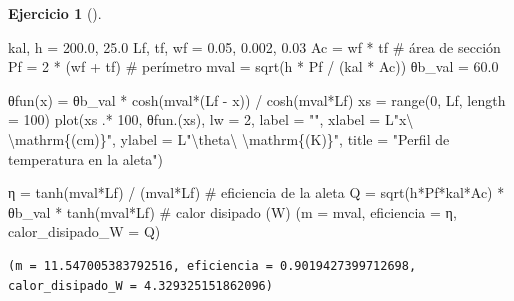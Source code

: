 \documentclass[
  spanish,
  a4paper,
]{scrreport}
\newenvironment{Shaded}{\begin{snugshade}}{\end{snugshade}}
\newcommand{\CommentTok}[1]{\textcolor[rgb]{0.37,0.37,0.37}{#1}}
\newcommand{\FloatTok}[1]{\textcolor[rgb]{0.68,0.00,0.00}{#1}}
\newcommand{\FunctionTok}[1]{\textcolor[rgb]{0.28,0.35,0.67}{#1}}
\newcommand{\NormalTok}[1]{\textcolor[rgb]{0.00,0.23,0.31}{#1}}
\newcommand{\OperatorTok}[1]{\textcolor[rgb]{0.37,0.37,0.37}{#1}}
\newcommand{\SpecialCharTok}[1]{\textcolor[rgb]{0.37,0.37,0.37}{#1}}
\newcommand{\StringTok}[1]{\textcolor[rgb]{0.13,0.47,0.30}{#1}}
\theoremstyle{definition}
\newtheorem{exercise}{Ejercicio}[chapter]
\theoremstyle{remark}
\begin{document}
\begin{exercise}[]
\begin{enumerate}
\begin{tcolorbox}
\begin{Shaded}
\begin{Highlighting}[]
\NormalTok{kal, h }\OperatorTok{=} \FloatTok{200.0}\NormalTok{, }\FloatTok{25.0}
\NormalTok{Lf, tf, wf }\OperatorTok{=} \FloatTok{0.05}\NormalTok{, }\FloatTok{0.002}\NormalTok{, }\FloatTok{0.03}
\NormalTok{Ac }\OperatorTok{=}\NormalTok{ wf }\OperatorTok{*}\NormalTok{ tf                     }\CommentTok{\# área de sección}
\NormalTok{Pf }\OperatorTok{=} \FloatTok{2} \OperatorTok{*}\NormalTok{ (wf }\OperatorTok{+}\NormalTok{ tf)               }\CommentTok{\# perímetro}
\NormalTok{mval }\OperatorTok{=} \FunctionTok{sqrt}\NormalTok{(h }\OperatorTok{*}\NormalTok{ Pf }\OperatorTok{/}\NormalTok{ (kal }\OperatorTok{*}\NormalTok{ Ac))}
\NormalTok{θb\_val }\OperatorTok{=} \FloatTok{60.0}

\FunctionTok{θfun}\NormalTok{(x) }\OperatorTok{=}\NormalTok{ θb\_val }\OperatorTok{*} \FunctionTok{cosh}\NormalTok{(}\FunctionTok{mval*}\NormalTok{(Lf }\OperatorTok{{-}}\NormalTok{ x)) }\OperatorTok{/} \FunctionTok{cosh}\NormalTok{(mval}\OperatorTok{*}\NormalTok{Lf)}
\NormalTok{xs }\OperatorTok{=} \FunctionTok{range}\NormalTok{(}\FloatTok{0}\NormalTok{, Lf, length }\OperatorTok{=} \FloatTok{100}\NormalTok{)}
\FunctionTok{plot}\NormalTok{(xs }\OperatorTok{.*} \FloatTok{100}\NormalTok{, }\FunctionTok{θfun}\NormalTok{.(xs), lw }\OperatorTok{=} \FloatTok{2}\NormalTok{, label }\OperatorTok{=} \StringTok{""}\NormalTok{,}
\NormalTok{     xlabel }\OperatorTok{=}\NormalTok{ L}\StringTok{"x\textbackslash{} \textbackslash{}mathrm\{(cm)\}"}\NormalTok{, ylabel }\OperatorTok{=}\NormalTok{ L}\StringTok{"}\SpecialCharTok{\textbackslash{}t}\StringTok{heta\textbackslash{} \textbackslash{}mathrm\{(K)\}"}\NormalTok{,}
\NormalTok{     title }\OperatorTok{=} \StringTok{"Perfil de temperatura en la aleta"}\NormalTok{)}

\NormalTok{η }\OperatorTok{=} \FunctionTok{tanh}\NormalTok{(mval}\OperatorTok{*}\NormalTok{Lf) }\OperatorTok{/}\NormalTok{ (mval}\OperatorTok{*}\NormalTok{Lf)          }\CommentTok{\# eficiencia de la aleta}
\NormalTok{Q }\OperatorTok{=} \FunctionTok{sqrt}\NormalTok{(h}\OperatorTok{*}\NormalTok{Pf}\OperatorTok{*}\NormalTok{kal}\OperatorTok{*}\NormalTok{Ac) }\OperatorTok{*}\NormalTok{ θb\_val }\OperatorTok{*} \FunctionTok{tanh}\NormalTok{(mval}\OperatorTok{*}\NormalTok{Lf)   }\CommentTok{\# calor disipado (W)}
\NormalTok{(m }\OperatorTok{=}\NormalTok{ mval, eficiencia }\OperatorTok{=}\NormalTok{ η, calor\_disipado\_W }\OperatorTok{=}\NormalTok{ Q)}
\end{Highlighting}
\end{Shaded}

\begin{verbatim}
(m = 11.547005383792516, eficiencia = 0.9019427399712698, calor_disipado_W = 4.329325151862096)
\end{verbatim}


\end{tcolorbox}
\end{enumerate}
\end{exercise}
\end{document}
